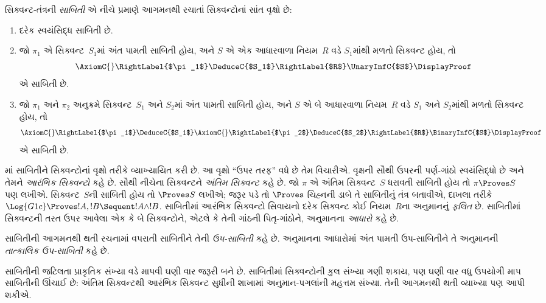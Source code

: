 \begin{defn}
સિક્વન્ટ-તંત્રની \emph{સાબિતી} એ નીચે પ્રમાણે
આગમનથી રચાતાં સિક્વન્ટોનાં સાંત વૃક્ષો છે:
\begin{enumerate}
  \item{} દરેક સ્વયંસિદ્ધ સાબિતી છે.
  \item{} જો $\pi_1$ એ
  સિક્વન્ટ~$S_1$માં અંત પામતી સાબિતી હોય, અને $S$ એ
  એક આધારવાળા નિયમ~$R$ વડે $S_1$માંથી મળતો સિક્વન્ટ હોય, તો
  \[
  \AxiomC{}
  \RightLabel{$\pi_1$}
  \DeduceC{$S_1$}
  \RightLabel{$R$}
  \UnaryInfC{$S$}
  \DisplayProof
  \]
  એ સાબિતી છે.
  \item{} જો $\pi_1$ અને $\pi_2$
  અનુક્રમે સિક્વન્ટ~$S_1$ અને $S_2$માં અંત પામતી સાબિતી
  હોય, અને $S$ એ બે આધારવાળા નિયમ~$R$ વડે $S_1$ અને $S_2$માંથી
  મળતો સિક્વન્ટ હોય, તો
  \[
  \AxiomC{}
  \RightLabel{$\pi_1$}
  \DeduceC{$S_1$}
  \AxiomC{}
  \RightLabel{$\pi_2$}
  \DeduceC{$S_2$}
  \RightLabel{$R$}
  \BinaryInfC{$S$}
  \DisplayProof
  \]
  એ સાબિતી છે.
\end{enumerate}
\end{defn}

માં સાબિતીને સિક્વન્ટોનાં વૃક્ષો
તરીકે વ્યાખ્યાયિત કરી છે. આ વૃક્ષો ``ઉપર તરફ''
વધે છે તેમ વિચારીએ. વૃક્ષની સૌથી ઉપરની પર્ણ-ગાંઠો
સ્વયંસિદ્ધો છે અને તેમને \emph{આરંભિક સિક્વન્ટો} કહે છે.
સૌથી નીચેના સિક્વન્ટને \emph{અંતિમ સિક્વન્ટ} કહે છે.
જો $\pi$ એ અંતિમ સિક્વન્ટ~$S$ ધરાવતી સાબિતી હોય તો
$\pi \Proves S$ પણ લખીએ. સિક્વન્ટ~$S$ની સાબિતી
હોય તો $\Proves S$ લખીએ; જરૂર પડે તો $\Proves$ ચિહ્નની
ડાબે તે સાબિતીનું તંત્ર બતાવીએ, દાખલા તરીકે
$\Log{G1c} \Proves !A, !B \Sequent !A \land
!B$. સાબિતીમાં આરંભિક સિક્વન્ટો સિવાયનો દરેક સિક્વન્ટ
કોઈ નિયમ~$R$ના અનુમાનનું \emph{ફલિત} છે.
સાબિતીમાં સિક્વન્ટની તરત ઉપર આવેલા એક કે બે સિક્વન્ટોને,
એટલે કે તેની ગાંઠની પિતૃ-ગાંઠોને, અનુમાનના \emph{આધારો} કહે છે.

સાબિતીની આગમનથી થતી રચનામાં વપરાતી
સાબિતીને તેની \emph{ઉપ-સાબિતી} કહે છે.
અનુમાનના આધારોમાં અંત પામતી ઉપ-સાબિતીને
તે અનુમાનની \emph{તાત્કાલિક ઉપ-સાબિતી} કહે છે.

સાબિતીની જટિલતા પ્રાકૃતિક સંખ્યા વડે માપવી ઘણી વાર
જરૂરી બને છે. સાબિતીમાં સિક્વન્ટોની કુલ સંખ્યા ગણી શકાય,
પણ ઘણી વાર વધુ ઉપયોગી માપ સાબિતીની ઊંચાઈ છે:
અંતિમ સિક્વન્ટથી આરંભિક સિક્વન્ટ સુધીની શાખામાં અનુમાન-પગલાંની
મહત્તમ સંખ્યા. તેની આગમનથી થતી વ્યાખ્યા પણ આપી શકીએ.


